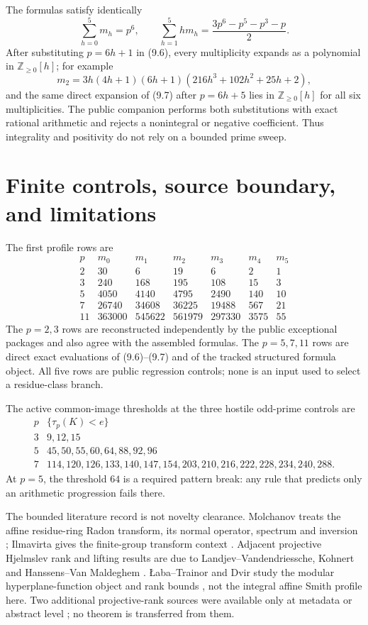 \documentclass[12pt,a4paper]{article}
\theoremstyle{definition}
\newcommand{\Z}{\mathbb Z}
\begin{document}
The formulas satisfy identically
\[
 \sum_{h=0}^{5}m_h=p^6,
 \qquad
 \sum_{h=1}^{5}hm_h=\frac{3p^6-p^5-p^3-p}{2}.
\tag{9.9}
\]
After substituting $p=6h+1$ in (9.6), every multiplicity expands as a
polynomial in $\Z_{\geq0}[h]$; for example
\[
 m_2=3h(4h+1)(6h+1)
 (216h^3+102h^2+25h+2),
\]
and the same direct expansion of (9.7) after $p=6h+5$ lies in
$\Z_{\geq0}[h]$ for all six multiplicities.  The public companion performs
both substitutions with exact rational arithmetic and rejects a nonintegral
or negative coefficient.  Thus integrality and positivity do not rely on a
bounded prime sweep.

\section{Finite controls, source boundary, and limitations}
\label{sec:controls}

The first profile rows are
\[
\begin{array}{c|rrrrrr}
p&m_0&m_1&m_2&m_3&m_4&m_5\\ \hline
2&30&6&19&6&2&1\\
3&240&168&195&108&15&3\\
5&4050&4140&4795&2490&140&10\\
7&26740&34608&36225&19488&567&21\\
11&363000&545622&561979&297330&3575&55
\end{array}
\tag{10.1}
\]
The $p=2,3$ rows are reconstructed independently by the public exceptional
packages and also agree with the assembled formulas.  The $p=5,7,11$ rows
are direct exact evaluations of (9.6)--(9.7) and of the tracked structured
formula object.  All five rows are public regression controls; none is an
input used to select a residue-class branch.

The active common-image thresholds at the three hostile odd-prime controls
are
\[
\begin{array}{c|l}
p&\{\tau_p(K)<e\}\\ \hline
3&9,12,15\\
5&45,50,55,60,64,88,92,96\\
7&114,120,126,133,140,147,154,203,210,216,222,228,234,240,288.
\end{array}
\tag{10.2}
\]
At $p=5$, the threshold $64$ is a required pattern break: any rule that
predicts only an arithmetic progression fails there.

The bounded literature record is not novelty clearance.  Molchanov treats
the affine residue-ring Radon transform, its normal operator, spectrum and
inversion \cite{MOL12}; Ilmavirta gives the finite-group transform context
\cite{ILM}.  Adjacent projective Hjelmslev rank and lifting results are due
to Landjev--Vandendriessche, Kohnert and Hanssens--Van Maldeghem
\cite{LV14,KOH09,HVM89}.  \L aba--Trainor and Dvir study the modular
hyperplane-function object and rank bounds \cite{LT25,DVI26}, not the
integral affine Smith profile here.  Two additional projective-rank sources
were available only at metadata or abstract level \cite{LAN17,BLR23}; no
theorem is transferred from them.
\end{document}
